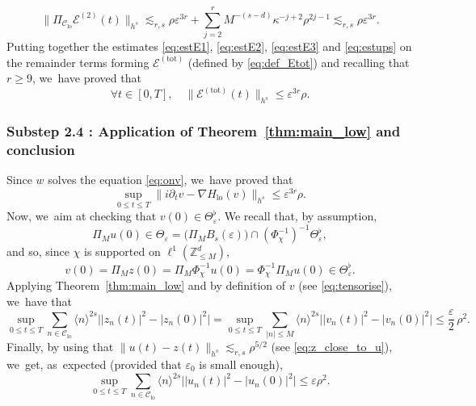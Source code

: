 \documentclass[10pt,a4paper]{amsart}
\theoremstyle{plain}
\theoremstyle{definition}
\DeclareMathOperator{\lo}{lo}
\newcommand{\1}{\mathbf{1}}
\newcommand{\Clo}{\mathscr{C}_{\lo}}
\begin{document}
\begin{equation}
\label{eq:estE2}
\| \Pi_{\Clo} \mathcal{E}^{(2)}(t)\|_{h^s} \lesssim_{r,s} \rho \varepsilon^{3r} + \sum_{j=2}^r M^{-(s-d)}
\kappa^{-j+2} \rho^{2j-1}
\lesssim_{r,s} \rho \varepsilon^{3r}.
\end{equation}
Putting together the estimates \eqref{eq:estE1}, \eqref{eq:estE2}, \eqref{eq:estE3} and \eqref{eq:estups} on the remainder terms forming $ \mathcal{E}^{\mathrm{(tot)}} $ (defined by \eqref{eq:def_Etot}) and recalling that $r\geq 9$, we~have proved that
\[
\forall t\in [0,T], \quad \| \mathcal{E}^{\mathrm{(tot)}}(t) \|_{h^s} \leq \varepsilon^{3r} \rho.
\]

\subsubsection*{Substep 2.4 : Application of Theorem~\ref{thm:main_low} and conclusion}
Since $w$ solves the equation \eqref{eq:onv}, we~have proved that
\[
\sup_{0\leq t \leq T} \| i\partial_t v - \nabla H_{\lo} (v) \|_{h^s} \leq \varepsilon^{3r} \rho.
\]
Now, we~aim at checking that $v(0) \in \Theta_{\varepsilon}^\flat$. We recall that, by assumption,
\[
\Pi_M u(0) \in \Theta_\varepsilon = \big(\Pi_{ M } B_s(\varepsilon) \big)\cap (\Phi_{\chi}^{-1})^{-1} \Theta_{\varepsilon}^\flat,
\]
and so, since $\chi$ is supported on $\ell^1(\mathbb{Z}^d_{\leq M})$,
\[
v(0) = \Pi_{M} z(0) = \Pi_M \Phi_\chi^{-1} u(0) = \Phi_\chi^{-1}\Pi_M u(0) \in \Theta_{\varepsilon}^\flat.
\]
Applying Theorem~\ref{thm:main_low} and by definition of $v$ (see \eqref{eq:tensorise}), we~have that\vspace*{-3pt}
\[
\sup_{0\leq t \leq T} \sum_{n\in \Clo} \langle n\rangle^{2s} \big| |z_{n}(t)|^2 - |z_{n}(0)|^2 \big| = \sup_{0\leq t \leq T} \sum_{ |n| \leq M} \langle n\rangle^{2s} \big| |v_{n}(t)|^2 - |v_{n}(0)|^2 \big|\leq \frac{\varepsilon}2\, \rho^2.
\]
Finally, by using that $\| u(t) - z(t) \|_{h^s} \lesssim_{r,s} \rho^{5/2}$ (see \eqref{eq:z_close_to_u}), we~get, as~expected (provided that $\varepsilon_0$ is small enough),\vspace*{-3pt}
\begin{equation}
\label{eq:a_citer_dans_lintro}
\sup_{0\leq t \leq T} \sum_{n\in \Clo} \langle n\rangle^{2s} \big| |u_n(t)|^2 - |u_n(0)|^2 \big|\leq \varepsilon \rho^2.
\end{equation}
\end{document}
